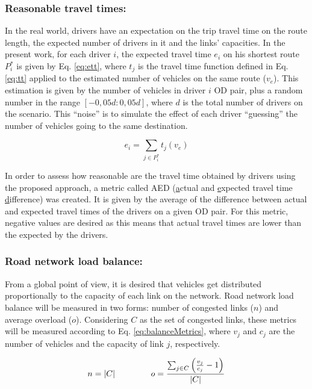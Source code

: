 \documentclass{RITA}
\newcommand{\optRoute}[1]{\ensuremath{P_#1^*}}	%
\newcommand{\travTime}{\ensuremath{t_j}} 	%
\newcommand{\linkCap}{\ensuremath{c_j}}		%
\newcommand{\veh}{\ensuremath{v}}		%
\newcommand{\ett}[1]{\ensuremath{e_#1}}		%
\newcommand{\expVeh}{\ensuremath{v_e}}		%
\newcommand{\congRoads}{\ensuremath{C}}		%
\newcommand{\numCong}{\ensuremath{n}}		%
\newcommand{\overLoadFactor}{\ensuremath{o}}	%
\begin{document}
\subsubsection{Reasonable travel times:}
In the real world, drivers have an expectation on the trip travel time on the route length, the expected number of drivers in it and the links' capacities. In the present work, for each driver $i$, the expected travel time $\ett{i}$ on his shortest route \optRoute{i} is given by Eq. \eqref{eq:ett}, where $\travTime$ is the travel time function defined in Eq. \eqref{eq:tt} applied to the estimated number of vehicles on the same route ($\expVeh$). This estimation is given by the number of vehicles in driver $i$ OD pair, plus a random number in the range $[-0,05d:0,05d]$, where $d$ is the total number of drivers on the scenario. This ``noise'' is to simulate the effect of each driver ``guessing'' the number of vehicles going to the same destination.

\begin{equation}
\label{eq:ett}
\ett{i} = \sum_{j \in \optRoute{i}}\travTime(\expVeh)
\end{equation}

In order to assess how reasonable are the travel time obtained by drivers using the proposed approach, a metric called AED (\underline{a}ctual and \underline{e}xpected travel time \underline{d}ifference) was created. It is given by the average of the difference between actual and expected travel times of the drivers on a given OD pair. For this metric, negative values are desired as this means that actual travel times are lower than the expected by the drivers.

\subsubsection{Road network load balance:}

From a global point of view, it is desired that vehicles get distributed proportionally to the capacity of each link on the network. Road network load balance will be measured in two forms: number of congested links ($n$) and average overload ($o$). Considering $C$ as the set of congested links, these metrics will be measured according to Eq. \eqref{eq:balanceMetrics}, where $\veh_j$ and $\linkCap$ are the number of vehicles and the capacity of link $j$, respectively. 

\begin{equation}
\label{eq:balanceMetrics}
\numCong = |\congRoads| \hspace{1.5cm}  \overLoadFactor = \frac{ \sum_{\substack{j \in \congRoads}} \left(\frac{\veh_j}{\linkCap} -1 \right)}{|C|}
\end{equation}
\end{document}
